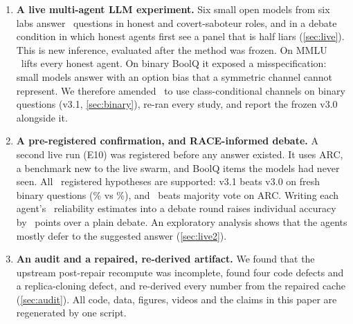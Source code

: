 \begin{enumerate}
\item \textbf{A live multi-agent LLM experiment.} Six small open models from six labs answer \nLiveTasks\ questions in honest and covert-saboteur roles, and in a debate condition in which honest agents first see a panel that is half liars (\cref{sec:live}). This is new inference, evaluated after the method was frozen. On MMLU \race\ lifts every honest agent. On binary BoolQ it exposed a misspecification: small models answer with an option bias that a symmetric channel cannot represent. We therefore amended \race\ to use class-conditional channels on binary questions (v3.1, \cref{sec:binary}), re-ran every study, and report the frozen v3.0 alongside it.
\item \textbf{A pre-registered confirmation, and RACE-informed debate.} A second live run (E10) was registered before any answer existed. It uses ARC, a benchmark new to the live swarm, and BoolQ items the models had never seen. All \hypSupported\ registered hypotheses are supported: v3.1 beats v3.0 on fresh binary questions (\hypHOneATarget\% vs \hypHOneABase\%), and \race\ beats majority vote on ARC. Writing each agent's \race\ reliability estimates into a debate round raises individual accuracy by \informedDelta\ points over a plain debate. An exploratory analysis shows that the agents mostly defer to the suggested answer (\cref{sec:live2}).
\item \textbf{An audit and a repaired, re-derived artifact.} We found that the upstream post-repair recompute was incomplete, found four code defects and a replica-cloning defect, and re-derived every number from the repaired cache (\cref{sec:audit}). All code, data, figures, videos and the claims in this paper are regenerated by one script.
\end{enumerate}
